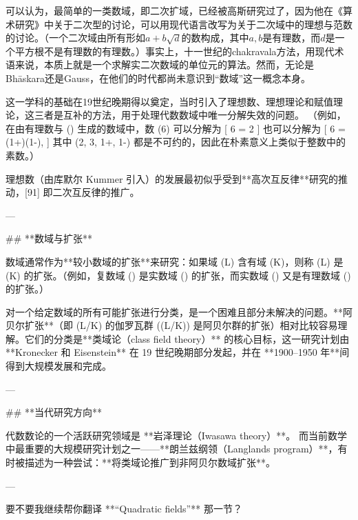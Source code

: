 可以认为，最简单的一类数域，即二次扩域，已经被高斯研究过了，因为他在《算术研究》中关于二次型的讨论，可以用现代语言改写为关于二次域中的理想与范数的讨论。（一个二次域由所有形如$a+b\sqrt{d}$的数构成，其中$a, b$是有理数，而$d$是一个平方根不是有理数的有理数。）事实上，十一世纪的chakravala方法，用现代术语来说，本质上就是一个求解实二次数域的单位元的算法。然而，无论是Bhāskara还是Gauss，在他们的时代都尚未意识到“数域”这一概念本身。

这一学科的基础在19世纪晚期得以奠定，当时引入了理想数、理想理论和赋值理论，这三者是互补的方法，用于处理代数数域中唯一分解失效的问题。
（例如，在由有理数与 () 生成的数域中，数 (6) 可以分解为
[
6 = 2 
]
也可以分解为
[
6 = (1+)(1-),
]
其中 (2, 3, 1+, 1-) 都是不可约的，因此在朴素意义上类似于整数中的素数。）

理想数（由库默尔 Kummer 引入）的发展最初似乎受到**高次互反律**研究的推动，[91] 即二次互反律的推广。

---

## **数域与扩张**

数域通常作为**较小数域的扩张**来研究：如果域 (L) 含有域 (K)，则称 (L) 是 (K) 的扩张。（例如，复数域 () 是实数域 () 的扩张，而实数域 () 又是有理数域 () 的扩张。）

对一个给定数域的所有可能扩张进行分类，是一个困难且部分未解决的问题。**阿贝尔扩张**（即 (L/K) 的伽罗瓦群 ((L/K)) 是阿贝尔群的扩张）相对比较容易理解。它们的分类是**类域论（class field theory）** 的核心目标，这一研究计划由 **Kronecker 和 Eisenstein** 在 19 世纪晚期部分发起，并在 **1900–1950 年**间得到大规模发展和完成。

---

## **当代研究方向**

代数数论的一个活跃研究领域是 **岩泽理论（Iwasawa theory）**。
而当前数学中最重要的大规模研究计划之一——**朗兰兹纲领（Langlands program）**，有时被描述为一种尝试：**将类域论推广到非阿贝尔数域扩张**。

---

要不要我继续帮你翻译 **“Quadratic fields”** 那一节？
